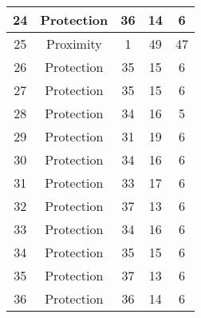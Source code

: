 \documentclass[results.tex]{subfiles}
\begin{document}
\begin{center}
\begin{tabular}{| c || c | c | c | c |}
            \hline
            24                      & Protection                   & 36                     & 14                      & 6                    \\
            \hline
            25                      & Proximity                    & 1                      & 49                      & 47                   \\
            \hline
            26                      & Protection                   & 35                     & 15                      & 6                    \\
            \hline
            27                      & Protection                   & 35                     & 15                      & 6                    \\
            \hline
            28                      & Protection                   & 34                     & 16                      & 5                    \\
            \hline
            29                      & Protection                   & 31                     & 19                      & 6                    \\
            \hline
            30                      & Protection                   & 34                     & 16                      & 6                    \\
            \hline
            31                      & Protection                   & 33                     & 17                      & 6                    \\
            \hline
            32                      & Protection                   & 37                     & 13                      & 6                    \\
            \hline
            33                      & Protection                   & 34                     & 16                      & 6                    \\
            \hline
            34                      & Protection                   & 35                     & 15                      & 6                    \\
            \hline
            35                      & Protection                   & 37                     & 13                      & 6                    \\
            \hline
            36                      & Protection                   & 36                     & 14                      & 6                    \\

\end{tabular}
\end{center}
\end{document}
